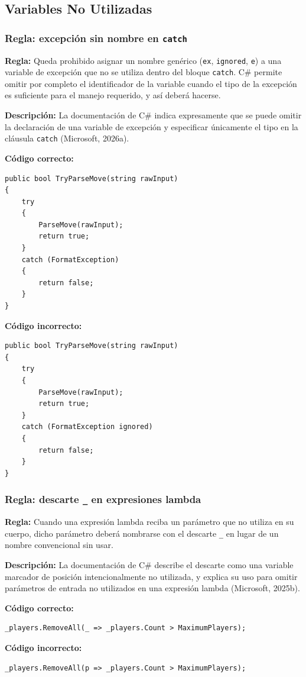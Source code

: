 \subsection{Variables No Utilizadas}

\subsubsection{Regla: excepción sin nombre en \texttt{catch}}

\textbf{Regla:} Queda prohibido asignar un nombre genérico (\texttt{ex}, \texttt{ignored}, \texttt{e}) a una variable de excepción que no se utiliza dentro del bloque \texttt{catch}. C\# permite omitir por completo el identificador de la variable cuando el tipo de la excepción es suficiente para el manejo requerido, y así deberá hacerse.

\textbf{Descripción:} La documentación de C\# indica expresamente que se puede omitir la declaración de una variable de excepción y especificar únicamente el tipo en la cláusula \texttt{catch} (Microsoft, 2026a).

\textbf{Código correcto:}
\begin{lstlisting}[style=csharpstyle]
public bool TryParseMove(string rawInput)
{
    try
    {
        ParseMove(rawInput);
        return true;
    }
    catch (FormatException)
    {
        return false;
    }
}
\end{lstlisting}

\textbf{Código incorrecto:}
\begin{lstlisting}[style=csharpstyle]
public bool TryParseMove(string rawInput)
{
    try
    {
        ParseMove(rawInput);
        return true;
    }
    catch (FormatException ignored)
    {
        return false;
    }
}
\end{lstlisting}

\subsubsection{Regla: descarte \texttt{\_} en expresiones lambda}

\textbf{Regla:} Cuando una expresión lambda reciba un parámetro que no utiliza en su cuerpo, dicho parámetro deberá nombrarse con el descarte \texttt{\_} en lugar de un nombre convencional sin usar.

\textbf{Descripción:} La documentación de C\# describe el descarte como una variable marcador de posición intencionalmente no utilizada, y explica su uso para omitir parámetros de entrada no utilizados en una expresión lambda (Microsoft, 2025b).

\textbf{Código correcto:}
\begin{lstlisting}[style=csharpstyle]
_players.RemoveAll(_ => _players.Count > MaximumPlayers);
\end{lstlisting}

\textbf{Código incorrecto:}
\begin{lstlisting}[style=csharpstyle]
_players.RemoveAll(p => _players.Count > MaximumPlayers);
\end{lstlisting}
